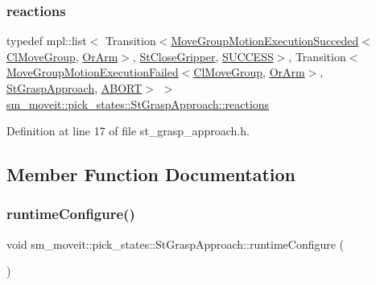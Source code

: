 \subsubsection{\texorpdfstring{reactions}{reactions}}
{\footnotesize\ttfamily typedef mpl\+::list$<$ Transition$<$\hyperlink{structmove__group__interface__client_1_1MoveGroupMotionExecutionSucceded}{Move\+Group\+Motion\+Execution\+Succeded}$<$\hyperlink{classmove__group__interface__client_1_1ClMoveGroup}{Cl\+Move\+Group}, \hyperlink{classsm__moveit_1_1OrArm}{Or\+Arm}$>$, \hyperlink{structsm__moveit_1_1pick__states_1_1StCloseGripper}{St\+Close\+Gripper}, \hyperlink{classSUCCESS}{S\+U\+C\+C\+E\+SS}$>$, Transition$<$\hyperlink{structmove__group__interface__client_1_1MoveGroupMotionExecutionFailed}{Move\+Group\+Motion\+Execution\+Failed}$<$\hyperlink{classmove__group__interface__client_1_1ClMoveGroup}{Cl\+Move\+Group}, \hyperlink{classsm__moveit_1_1OrArm}{Or\+Arm}$>$, \hyperlink{structsm__moveit_1_1pick__states_1_1StGraspApproach}{St\+Grasp\+Approach}, \hyperlink{classABORT}{A\+B\+O\+RT}$>$ $>$ \hyperlink{structsm__moveit_1_1pick__states_1_1StGraspApproach_a459914092dd4d74c25550ca4438a3ff4}{sm\+\_\+moveit\+::pick\+\_\+states\+::\+St\+Grasp\+Approach\+::reactions}}



Definition at line 17 of file st\+\_\+grasp\+\_\+approach.\+h.



\subsection{Member Function Documentation}
\mbox{\label{structsm__moveit_1_1pick__states_1_1StGraspApproach_a2f8bdc983aeb3ba4b0d2e2f0c4e12d8d}} 
\subsubsection{\texorpdfstring{runtime\+Configure()}{runtimeConfigure()}}
{\footnotesize\ttfamily void sm\+\_\+moveit\+::pick\+\_\+states\+::\+St\+Grasp\+Approach\+::runtime\+Configure (\begin{DoxyParamCaption}{ }\end{DoxyParamCaption})\hspace{0.3cm}{\ttfamily [inline]}}



